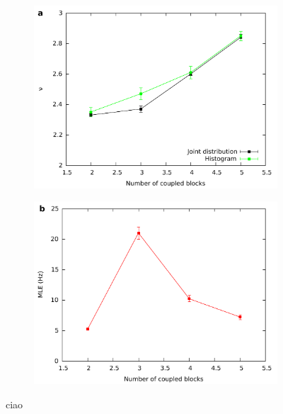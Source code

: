 \documentclass[a4paper,11pt,aps,secnumarabic,balancelastpage,amsmath,amssymb,floatfix,table]{article}
\begin{document}
\begin{figure}[H]
    \centering
    \begin{subfigure}{.49\textwidth}
        \includegraphics[width=\linewidth]
        {../nu_blocks.pdf}
    \end{subfigure}
    \begin{subfigure}{.49\textwidth}
        \centering
        \includegraphics[width=\linewidth]
        {../mle_blocks.pdf}
    \end{subfigure}
    \caption{ciao}
    \label{fig:nu mle blocks}
\end{figure}

\clearpage

\printbibliography
\end{document}
